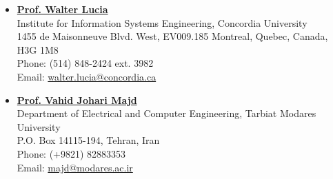 \documentclass[letterpaper,10.8pt]{article}
\begin{document}
     \begin{itemize}
         \item \href{https://users.encs.concordia.ca/~wlucia/index.html}{\textbf{Prof. Walter Lucia}}\\ 
         Institute for Information Systems Engineering, Concordia University \\
         1455 de Maisonneuve Blvd. West, EV009.185 Montreal, Quebec, Canada, H3G 1M8\\
         Phone: (514) 848-2424 ext. 3982\\
         Email: \href{mailto: walter.lucia@concordia.ca}{ walter.lucia@concordia.ca}
         \item \href{https://www.modares.ac.ir/~majd}{\textbf{Prof. Vahid Johari Majd}}\\
         Department of Electrical and Computer Engineering, Tarbiat Modares University\\
         P.O. Box 14115-194, Tehran, Iran\\
         Phone: (+9821) 82883353\\
         Email: \href{mailto: majd@modares.ac.ir}{ majd@modares.ac.ir}
     \end{itemize}
     
\end{document}
